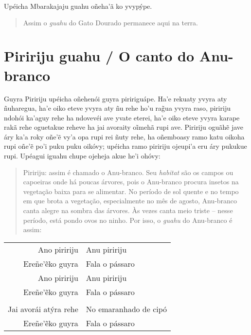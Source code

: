 \begin{itemize}
Upéicha Mbarakajaju guahu oñeha'ã ko yvypýpe.

\begin{quote}
Assim o \emph{guahu} do Gato Dourado permanece aqui na terra.
\end{quote}

\chapter{Piririju guahu / O canto do Anu-branco}

Guyra Piririju upéicha oñehenói guyra piririguápe. Ha'e rekuaty yvyra
aty ñuharegua, ha'e oiko eteve yvyra aty ñu rehe ho'u rag̃ua yvyra raso,
piririju ndohói ka'aguy rehe ha ndovevéi ave yvate eterei, ha'e oiko
eteve yvyra karape rakã rehe oguetakue reheve ha jai avoraity oĩmehã
rupi ave. Piririju oguãhẽ jave áry ka'a roky oñe'ẽ vy'a opa rupi rei
ñuty rehe, ha oñemboasy ramo katu oikoha rupi oñe'ẽ po'i puku puku
oikóvy; upéicha ramo piririju ojeupi'a eru áry pukukue rupi. Upéagui
iguahu chupe ojeheja akue he'i ohóvy:

\begin{quote}
Piririju: assim é chamado o Anu-branco. Seu \emph{habitat} são os campos
ou capoeiras onde há poucas árvores, pois o Anu-branco procura insetos
na vegetação baixa para se alimentar. No período de sol quente e no
tempo em que brota a vegetação, especialmente no mês de agosto,
Anu-branco canta alegre na sombra das árvores. Às vezes canta meio
triste -- nesse período, está pondo ovos no ninho. Por isso, o
\emph{guahu} do Anu-branco é assim:
\end{quote}


\begin{table}[]
\begin{tabular}{rl}
Ano piririju          & Anu piririju\footnotemark{}           \\
Ereñe'ẽko guyra          & Fala o pássaro           \\
Ano piririju 		& Anu piririju \\
Ereñe'ẽko guyra          & Fala o pássaro           \\
                  &                     \\
Jai avorái atýra rehe 		& No emaranhado de cipó\footnotemark{} \\
Ereñe'ẽko guyra          & Fala o pássaro           \\
\end{tabular}
\end{table}


\end{itemize}
